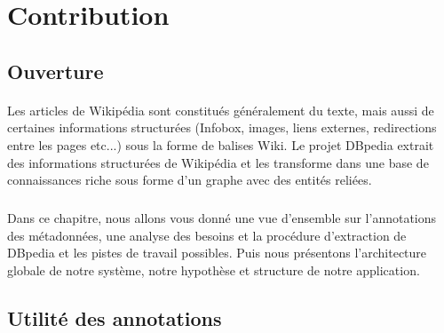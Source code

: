 \documentclass[12pt,a4	]{report}
\begin{document}
\section*{Contribution}
\subsection*{Ouverture}
\paragraph{}
Les articles de Wikipédia sont constitués généralement du texte, mais aussi de certaines informations structurées (Infobox, images, liens externes, redirections entre les pages etc...) sous la forme de balises Wiki. 
Le projet DBpedia extrait des informations structurées de Wikipédia et les transforme dans une base de connaissances riche sous forme d'un graphe avec des entités reliées.
\subparagraph{}
Dans ce chapitre, nous allons vous donné une vue d'ensemble sur l'annotations des métadonnées, une analyse des besoins et la procédure d'extraction de DBpedia et les pistes de travail possibles. Puis nous présentons l'architecture globale de notre système, notre hypothèse et structure de notre application. 
\subsection*{Utilité des annotations}
\end{document}
